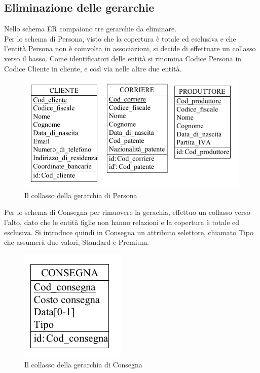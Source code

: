 \documentclass[a4paper,12pt]{report}
\begin{document}
\subsection{Eliminazione delle gerarchie}
Nello schema ER compaiono tre gerarchie da eliminare.\\
Per lo schema di Persona, visto che la copertura è totale ed esclusiva e che l'entità Persona non è coinvolta in associazioni, si decide di effettuare un collasso verso il basso.
Come identificatori delle entità si rinomina Codice Persona in Codice Cliente in cliente, e così via nelle altre due entità.
\begin{figure}[H]
	\centering{}
	\includegraphics[width=\textwidth]{img/SchemaLogico-Persona.pdf}
	\caption{Il collasso della gerarchia di Persona}
\end{figure}
Per lo schema di Consegna per rimuovere la gerachia, effettuo un collasso verso l'alto, dato che le entità figlie non hanno relazioni e la copertura è totale ed esclusiva. 
Si introduce quindi in Consegna un attributo selettore, chiamato Tipo che assumerà due valori, Standard e Premium. 
\begin{figure}[H]
	\centering{}
	\includegraphics[width=\textwidth]{img/SchemaLogico-Consegna.pdf}
	\caption{Il collasso della gerarchia di Consegna}
\end{figure}
\end{document}
